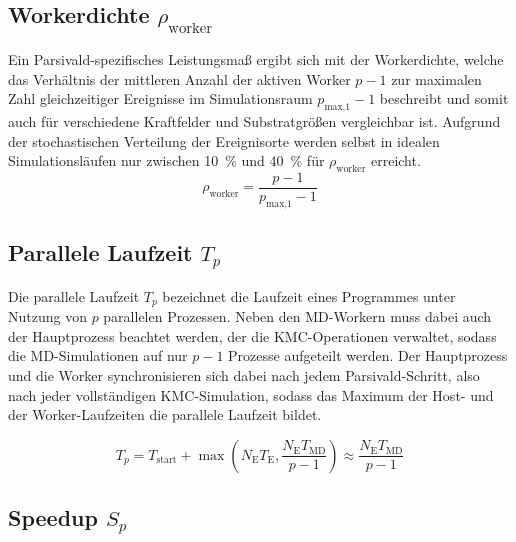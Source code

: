 \subsection{Workerdichte $\rho_\text{worker}$}

Ein Parsivald-spezifisches Leistungsmaß ergibt sich mit der Workerdichte, welche das Verhältnis der mittleren Anzahl der aktiven Worker $p-1$ zur maximalen Zahl gleichzeitiger Ereignisse im Simulationsraum $p_\text{max,1}-1$ beschreibt und somit auch für verschiedene Kraftfelder und Substratgrößen vergleichbar ist.
Aufgrund der stochastischen Verteilung der Ereignisorte werden selbst in idealen Simulationsläufen nur zwischen \SI{10}{\percent} und \SI{40}{\percent} für $\rho_\text{worker}$ erreicht.
\begin{equation}
  \rho_\text{worker} = \frac{p - 1}{p_\text{max,1} - 1}
\end{equation}

\subsection{Parallele Laufzeit $T_p$}

Die parallele Laufzeit $T_p$ bezeichnet die Laufzeit eines Programmes unter Nutzung von $p$ parallelen Prozessen.
Neben den MD-Workern muss dabei auch der Hauptprozess beachtet werden, der die KMC-Operationen verwaltet, sodass die MD-Simulationen auf nur $p-1$ Prozesse aufgeteilt werden.
Der Hauptprozess und die Worker synchronisieren sich dabei nach jedem Parsivald-Schritt, also nach jeder vollständigen KMC-Simulation, sodass das Maximum der Host- und der Worker-Laufzeiten die parallele Laufzeit bildet.

\begin{equation}
  T_p = T_\text{start} + \max\left(N_\text{E} T_\text{E}, \frac{N_\text{E} T_\text{MD}}{p-1}\right) \approx \frac{N_\text{E} T_\text{MD}}{p-1}
\end{equation}

\subsection{Speedup $S_p$}

